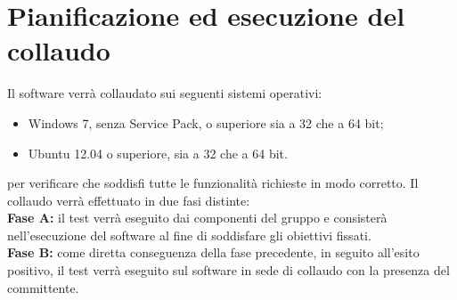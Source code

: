 \section{Pianificazione ed esecuzione del collaudo}
\label{collaudo}
Il software verrà collaudato sui seguenti sistemi operativi:
\begin{itemize}
\item Windows\g{} 7, senza Service Pack, o superiore sia a 32 che a 64 bit;
\item Ubuntu 12.04 o superiore, sia a 32 che a 64 bit.
\end{itemize}
per verificare che soddisfi tutte le funzionalità richieste in modo corretto. Il collaudo verrà effettuato in due fasi distinte:\\
\textbf{Fase A:} il test verrà eseguito dai componenti del gruppo \authorName{} e consisterà nell'esecuzione del software al fine di soddisfare gli obiettivi fissati. \\
\textbf{Fase B:} come diretta conseguenza della fase precedente, in seguito all'esito positivo, il test verrà eseguito sul software in sede di collaudo con la presenza del committente.
